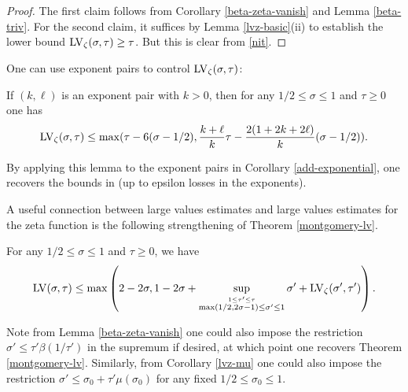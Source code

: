 \begin{proof}  The first claim follows from Corollary \ref{beta-zeta-vanish} and Lemma \ref{beta-triv}.  For the second claim, it suffices by Lemma \ref{lvz-basic}(ii) to establish the lower bound $\mathrm{LV}_\zeta(\sigma,\tau) \geq \tau$.  But this is clear from \eqref{nit}.
\end{proof}


One can use exponent pairs to control $\mathrm{LV}_\zeta(\sigma,\tau)$:

\begin{lemma}\label{zeta-from-exp}\cite[Theorem 8.2]{ivic} If $(k,\ell)$ is an exponent pair with $k>0$, then for any $1/2 \leq \sigma \leq 1$ and $\tau \geq 0$ one has
    $$ \mathrm{LV}_\zeta(\sigma,\tau) \leq \max( \tau - 6(\sigma-1/2), \frac{k+\ell}{k} \tau - \frac{2(1+2k+2\ell)}{k} (\sigma-1/2) ).$$
\end{lemma}

By applying this lemma to the exponent pairs in Corollary \ref{add-exponential}, one recovers the bounds in \cite[Corollary 8.1, 8.2]{ivic} (up to epsilon losses in the exponents).

A useful connection between large values estimates and large values estimates for the zeta function is the following strengthening of Theorem \ref{montgomery-lv}.

\begin{lemma}\label{hl-improv}  For any $1/2 \leq \sigma \leq 1$ and $\tau \geq 0$, we have
    $$ \mathrm{LV}(\sigma,\tau) \leq \max\left(2-2\sigma, 1 - 2\sigma + \sup_{\stackrel{1 \leq \tau' \leq \tau}{\max(1/2,2\sigma-1) \leq \sigma' \leq 1}}  \sigma' + \mathrm{LV}_\zeta(\sigma',\tau') \right).$$
\end{lemma}

Note from Lemma \ref{beta-zeta-vanish} one could also impose the restriction $\sigma' \leq \tau' \beta(1/\tau')$ in the supremum if desired, at which point one recovers Theorem \ref{montgomery-lv}.  Similarly, from Corollary \ref{lvz-mu} one could also impose the restriction $\sigma' \leq \sigma_0 + \tau' \mu(\sigma_0)$ for any fixed $1/2 \leq \sigma_0 \leq 1$.

